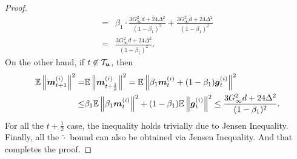 \begin{proof}
\begin{align*}
= & \beta_1 \cdot \frac{3G_\infty^2d+24\Delta^2}{(1-\beta_1)^2} + \frac{3G_\infty^2d+24\Delta^2}{(1-\beta_1)^2} \\
= & \frac{3G_\infty^2d+24\Delta^2}{(1-\beta_1)^2}.
\end{align*}
On the other hand, if $t\not\in\mathcal{T}_{\boldsymbol{u}}$, then
\begin{align*}
    \mathbb{E}\left\| \boldsymbol{m}_{t+1}^{(i)}\right\|^2 = & \mathbb{E}\left\| \boldsymbol{m}_{t+\frac{1}{2}}^{(i)}\right\|^2 = \mathbb{E}\left\| \beta_1\boldsymbol{m}_{t}^{(i)} + (1-\beta_1)\boldsymbol{g}_{t}^{(i)}\right\|^2 \\
\leq & \beta_1\mathbb{E}\left\| \beta_1\boldsymbol{m}_{t}^{(i)}\right\|^2 + (1-\beta_1)\mathbb{E}\left\| \boldsymbol{g}_{t}^{(i)}\right\|^2 \leq \frac{3G_\infty^2d+24\Delta^2}{(1-\beta_1)^2}.
\end{align*}
For all the $t+\frac{1}{2}$ case, the inequality holds trivially due to Jensen Inequality. Finally, all the $\tilde{\cdot}$ bound can also be obtained via Jensen Inequality. And that completes the proof.
\end{proof}


